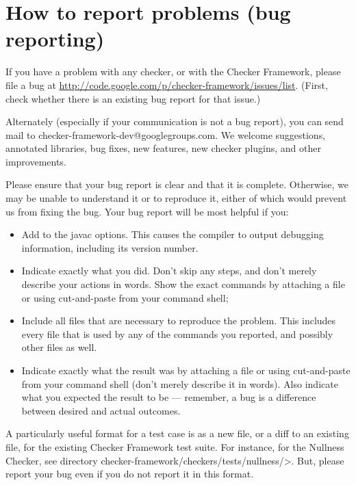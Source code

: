 \section{How to report problems (bug reporting)\label{reporting-bugs}}

If you have a problem with any checker, or with the Checker Framework,
please file a bug at 
\url{http://code.google.com/p/checker-framework/issues/list}.
(First, check whether there is an existing bug report for that issue.)

Alternately (especially if your communication is not a bug report), you can
send mail to checker-framework-dev@googlegroups.com.
We welcome suggestions, annotated libraries, bug fixes, new
features, new checker plugins, and other improvements.

Please ensure that your bug report is clear and that it is complete.
Otherwise, we may be unable to understand it or to reproduce it, either of
which would prevent us from fixing the bug.  Your bug report will be most
helpful if you:

\begin{itemize}
\item
  Add  to the javac options.  This causes the compiler to output
  debugging information, including its version number.
\item
  Indicate exactly what you did.  Don't skip any steps, and don't merely
  describe your actions in words.  Show the exact commands by attaching a
  file or using cut-and-paste from your command shell;
\item
  Include all files that are necessary to reproduce the problem.  This
  includes every file that is used by any of the commands you reported, and
  possibly other files as well.
\item
  Indicate exactly what the result was by attaching a file or using
  cut-and-paste from your command shell (don't merely describe it in
  words).  Also indicate what you expected the result to be --- remember, a
  bug is a difference between desired and actual outcomes.
\end{itemize}

A particularly useful format for a test case is as a new file, or a diff to
an existing file, for the existing Checker Framework test suite.  For
instance, for the Nullness
Checker, see directory \<checker-framework/checkers/tests/nullness/>.
But, please report your bug even if you do not report it in this format.


